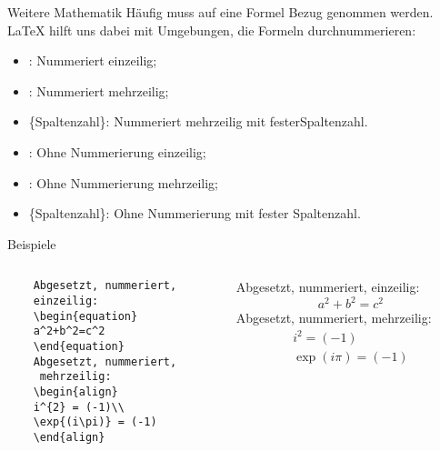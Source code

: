 \begin{frame}[fragile]{Weitere Mathematik}
Häufig muss auf eine Formel Bezug genommen werden. \LaTeX{} hilft uns dabei mit Umgebungen, die Formeln durchnummerieren:
\begin{itemize}
\item {}: Nummeriert einzeilig;
\item {}: Nummeriert mehrzeilig;
\item {}\textrm{\{\textlangle Spaltenzahl\textrangle\}}: Nummeriert mehrzeilig mit festerSpaltenzahl.
\item {}: Ohne Nummerierung einzeilig;
\item {}: Ohne Nummerierung mehrzeilig;
\item {}\textrm{\{\textlangle Spaltenzahl\textrangle\}}: Ohne Nummerierung mit fester Spaltenzahl.
\end{itemize}
\end{frame}

\begin{frame}[fragile]{Beispiele}
\begin{columns}
\begin{column}{.48\textwidth}\footnotesize
\begin{codeblock}
\begin{verbatim}
	Abgesetzt, nummeriert, 
	einzeilig:
    \begin{equation}
    a^2+b^2=c^2
    \end{equation}
    Abgesetzt, nummeriert,
     mehrzeilig:
    \begin{align}
    i^{2} = (-1)\\
    \exp{(i\pi)} = (-1) 
    \end{align}
\end{verbatim}
\end{codeblock}
\end{column}
%
\begin{column}{.45\textwidth}		
	Abgesetzt, nummeriert, einzeilig:
    \begin{equation}
    a^2+b^2=c^2
    \end{equation}
    Abgesetzt, nummeriert, mehrzeilig:
    \begin{align}
    i^{2} = (-1)\\
    \exp{(i\pi)} = (-1) 
    \end{align}
\end{column}
\end{columns}
\end{frame}

